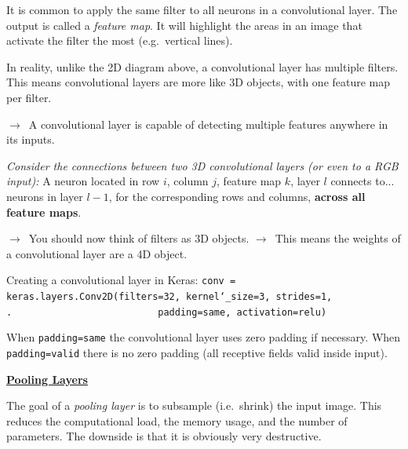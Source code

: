 It is common to apply the same filter to all neurons in a convolutional layer.\newline
The output is called a \textit{feature map}.\newline
It will highlight the areas in an image that activate the filter the most (e.g.~vertical lines).

In reality,
unlike the 2D diagram above,
a convolutional layer has multiple filters.\newline
This means convolutional layers are more like 3D objects,
with one feature map per filter.

$\rightarrow$~A convolutional layer is capable of detecting multiple features
anywhere in its inputs.

\textit{Consider the connections between two 3D convolutional layers (or even to a RGB input):}\newline
A neuron located in row $i$, column $j$, feature map $k$, layer $l$ connects to...\newline
neurons in layer $l-1$, for the corresponding rows and columns, \textbf{across all feature maps}.

$\rightarrow$~You should now think of filters as 3D objects.\newline
$\rightarrow$~This means the weights of a convolutional layer are a 4D object.

Creating a convolutional layer in Keras:\newline
\texttt{conv = keras.layers.Conv2D(filters=32, kernel\char`_size=3, strides=1,\newline
.~~~~~~~~~~~~~~~~~~~~~~~~~~padding=\textquotesingle same\textquotesingle, activation=\textquotesingle relu\textquotesingle)}

When \texttt{padding=\textquotesingle same\textquotesingle}
the convolutional layer uses zero padding if necessary.\newline
When \texttt{padding=\textquotesingle valid\textquotesingle}
there is no zero padding (all receptive fields valid inside input).\newline\newline

\textbf{\underline{Pooling Layers}}

The goal of a \textit{pooling layer} is to subsample (i.e.~shrink) the input image.\newline
This reduces the computational load, the memory usage, and the number of parameters.\newline
The downside is that it is obviously very destructive.

